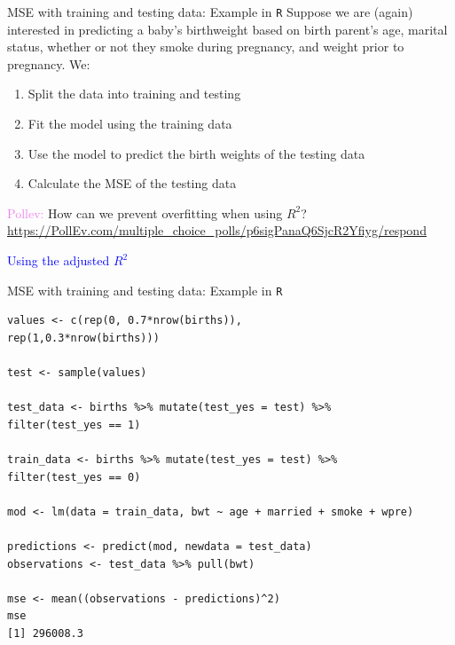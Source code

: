 \documentclass[10pt,t]{beamer}
\begin{document}
\begin{frame}{MSE with training and testing data: Example in \texttt{R}}
	Suppose we are (again) interested in predicting a baby's birthweight based on birth parent's age, marital status, whether or not they smoke during pregnancy, and weight prior to pregnancy. We:
	\medskip
	
	\begin{enumerate}
		\item Split the data into training and testing
		\medskip
		\item Fit the model using the training data
		\medskip
		\item Use the model to predict the birth weights of the testing data
		\medskip
		\item Calculate the MSE of the testing data
	\end{enumerate}
	\bigskip
	
		\bigskip
	\textcolor{violet}{Pollev:} How can we prevent overfitting when using $R^2$?
	\scriptsize{\url{https://PollEv.com/multiple_choice_polls/p6sigPanaQ6SjcR2Yfiyg/respond}}\pause
	\medskip
	\normalsize
	
	\textcolor{blue}{Using the adjusted $R^2$}

	\end{frame}
	
\begin{frame}[fragile]{MSE with training and testing data: Example in \texttt{R}}
	
	\vspace{-7mm}
	
\begin{verbatim}
values <- c(rep(0, 0.7*nrow(births)),
rep(1,0.3*nrow(births)))

test <- sample(values)

test_data <- births %>% mutate(test_yes = test) %>%
filter(test_yes == 1)

train_data <- births %>% mutate(test_yes = test) %>%
filter(test_yes == 0)

mod <- lm(data = train_data, bwt ~ age + married + smoke + wpre)

predictions <- predict(mod, newdata = test_data)
observations <- test_data %>% pull(bwt)

mse <- mean((observations - predictions)^2)
mse
[1] 296008.3
\end{verbatim}
\end{frame}
\end{document}
